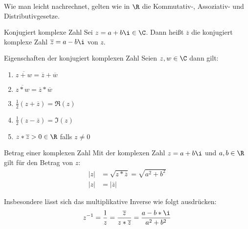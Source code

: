 \bemerkung
Wie man leicht nachrechnet, gelten wie in $\R$ die Kommutativ-, Assoziativ- und Distributivgesetze.

\begin{definition}{Konjugiert komplexe Zahl}
	Sei $z=a+b\i\in\C$. Dann heißt $\overline z$ die konjugiert komplexe Zahl $\overline z=a-b\i$ von $z$.
\end{definition}

\begin{satz}{Eigenschaften der konjugiert komplexen Zahl}
  Seien $z,w\in\C$ dann gilt:
  \begin{enumerate}
    \item $\overline{z+w}=\overline z+\overline w$
    \item $\overline{z* w}=\overline z * \overline w$
    \item $\frac 1 2 (z+\overline z)=\Re(z)$
    \item $\frac 1 2 (z-\overline z)=\Im(z)$
    \item $z* \overline z > 0 \in\R$ falls $z\neq0$
  \end{enumerate}
\end{satz}

\begin{definition}{Betrag einer komplexen Zahl}
	Mit der komplexen Zahl $z=a+b\i$ und $a,b\in\R$ gilt für den Betrag von $z$:
	\begin{align*}
	  |z|&=\sqrt{z*\overline z}=\sqrt{a^2+b^2}\\
	  |z|&=|\overline z|
	\end{align*}
\end{definition}

Insbesondere lässt sich das multiplikative Inverse wie folgt ausdrücken:
\begin{equation*}
  z^{-1}=\frac 1 z=\frac{\overline z}{z*\overline z}=\frac{a-b*\i}{a^2+b^2}
\end{equation*}
